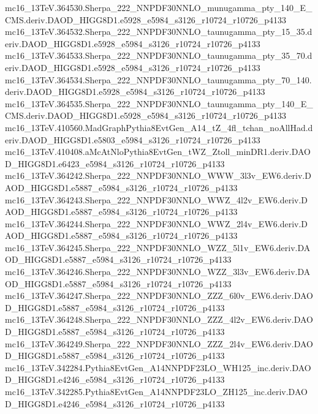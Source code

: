 mc16_13TeV.364530.Sherpa_222_NNPDF30NNLO_munugamma_pty_140_E_CMS.deriv.DAOD_HIGG8D1.e5928_e5984_s3126_r10724_r10726_p4133 \\
mc16_13TeV.364532.Sherpa_222_NNPDF30NNLO_taunugamma_pty_15_35.deriv.DAOD_HIGG8D1.e5928_e5984_s3126_r10724_r10726_p4133 \\
mc16_13TeV.364533.Sherpa_222_NNPDF30NNLO_taunugamma_pty_35_70.deriv.DAOD_HIGG8D1.e5928_e5984_s3126_r10724_r10726_p4133 \\
mc16_13TeV.364534.Sherpa_222_NNPDF30NNLO_taunugamma_pty_70_140.deriv.DAOD_HIGG8D1.e5928_e5984_s3126_r10724_r10726_p4133 \\
mc16_13TeV.364535.Sherpa_222_NNPDF30NNLO_taunugamma_pty_140_E_CMS.deriv.DAOD_HIGG8D1.e5928_e5984_s3126_r10724_r10726_p4133 \\
mc16_13TeV.410560.MadGraphPythia8EvtGen_A14_tZ_4fl_tchan_noAllHad.deriv.DAOD_HIGG8D1.e5803_e5984_s3126_r10724_r10726_p4133 \\
mc16_13TeV.410408.aMcAtNloPythia8EvtGen_tWZ_Ztoll_minDR1.deriv.DAOD_HIGG8D1.e6423_e5984_s3126_r10724_r10726_p4133 \\
mc16_13TeV.364242.Sherpa_222_NNPDF30NNLO_WWW_3l3v_EW6.deriv.DAOD_HIGG8D1.e5887_e5984_s3126_r10724_r10726_p4133 \\
mc16_13TeV.364243.Sherpa_222_NNPDF30NNLO_WWZ_4l2v_EW6.deriv.DAOD_HIGG8D1.e5887_e5984_s3126_r10724_r10726_p4133 \\
mc16_13TeV.364244.Sherpa_222_NNPDF30NNLO_WWZ_2l4v_EW6.deriv.DAOD_HIGG8D1.e5887_e5984_s3126_r10724_r10726_p4133 \\
mc16_13TeV.364245.Sherpa_222_NNPDF30NNLO_WZZ_5l1v_EW6.deriv.DAOD_HIGG8D1.e5887_e5984_s3126_r10724_r10726_p4133 \\
mc16_13TeV.364246.Sherpa_222_NNPDF30NNLO_WZZ_3l3v_EW6.deriv.DAOD_HIGG8D1.e5887_e5984_s3126_r10724_r10726_p4133 \\
mc16_13TeV.364247.Sherpa_222_NNPDF30NNLO_ZZZ_6l0v_EW6.deriv.DAOD_HIGG8D1.e5887_e5984_s3126_r10724_r10726_p4133 \\
mc16_13TeV.364248.Sherpa_222_NNPDF30NNLO_ZZZ_4l2v_EW6.deriv.DAOD_HIGG8D1.e5887_e5984_s3126_r10724_r10726_p4133 \\
mc16_13TeV.364249.Sherpa_222_NNPDF30NNLO_ZZZ_2l4v_EW6.deriv.DAOD_HIGG8D1.e5887_e5984_s3126_r10724_r10726_p4133 \\
mc16_13TeV.342284.Pythia8EvtGen_A14NNPDF23LO_WH125_inc.deriv.DAOD_HIGG8D1.e4246_e5984_s3126_r10724_r10726_p4133 \\
mc16_13TeV.342285.Pythia8EvtGen_A14NNPDF23LO_ZH125_inc.deriv.DAOD_HIGG8D1.e4246_e5984_s3126_r10724_r10726_p4133 \\
